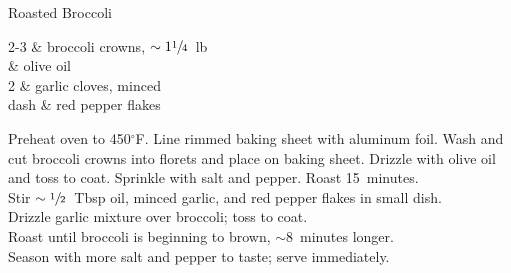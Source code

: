 \setHeadlines
{
}

\begin{recipe}
[ %
    source = Inspired by Rayn,
]
{Roasted Broccoli}

    \ingredients
    {
		2-3 & broccoli crowns, $\sim1\sfrac{1}{4}$~lb \\
		 & olive oil \\
		2 & garlic cloves, minced \\
		dash & red pepper flakes \\
    }
    
    \preparation
    {
        \step Preheat oven to 450$^{\circ}$F. Line rimmed baking sheet with aluminum foil. 
		\step Wash and cut broccoli crowns into florets and place on baking sheet. 
		\step Drizzle with olive oil and toss to coat. Sprinkle with salt and pepper. 
		\step Roast 15~minutes. \\
		\step Stir $\sim\sfrac{1}{2}$~Tbsp oil, minced garlic, and red pepper flakes in small dish. \\
		\step Drizzle garlic mixture over broccoli; toss to coat. \\
		\step Roast until broccoli is beginning to brown, $\sim$8~minutes longer. \\
		\step Season with more salt and pepper to taste; serve immediately. \\
    }

\end{recipe}
